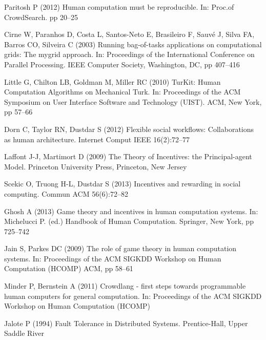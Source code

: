 \documentclass[11pt]{bmc_article_s50}
\begin{document}
\begin{thebibliography}{000}
Paritosh P (2012)
{Human computation must be reproducible}.
In: {Proc.of CrowdSearch}.
pp 20--{25}



Cirne W,
Paranhos D,
Costa L,
Santos-Neto E,
Brasileiro F,
Sauv{\'e} J,
Silva FA,
Barros CO,
Silveira C (2003)
{Running bag-of-tasks applications on computational grids: The mygrid
  approach}.
In: {Proceedings of the International Conference on Parallel
  Processing}.
{IEEE Computer Society},
{Washington, DC},
pp 407--{416}

Little G,
Chilton LB,
Goldman M,
Miller RC (2010)
{{TurKit: Human Computation Algorithms on Mechanical Turk}}.
In: {Proceedings of the ACM Symposium on User Interface Software and
  Technology (UIST)}.
{ACM},
{New York},
pp 57--{66}

Dorn C,
Taylor RN,
Dustdar S (2012)
{Flexible social workflows: Collaborations as human architecture}.
{Internet Comput IEEE}
{16}(2):72--{77}


Laffont J-J,
Martimort D (2009)
{The Theory of Incentives: the Principal-agent Model}.
{Princeton University Press},
{Princeton, New Jersey}



Scekic O,
Truong H-L,
Dustdar S (2013)
{Incentives and rewarding in social computing}.
{Commun ACM}
{56}(6):72--{82}



Ghosh A (2013)
{Game theory and incentives in human computation systems}.
In: Michelucci P. (ed.)
{Handbook of Human Computation}.
{Springer},
{New York},
pp 725--{742}



Jain S,
Parkes DC (2009)
{The role of game theory in human computation systems}.
In: {Proceedings of the ACM SIGKDD Workshop on Human Computation
  (HCOMP)}
{ACM},
pp 58--{61}


Minder P,
Bernstein A (2011)
{Crowdlang - first steps towards programmable human computers for
  general computation}.
In: {Proceedings of the ACM SIGKDD Workshop on Human Computation
  (HCOMP)}



Jalote P (1994)
{Fault Tolerance in Distributed Systems}.
{Prentice-Hall},
{Upper Saddle River}




\end{thebibliography}
\end{document}
